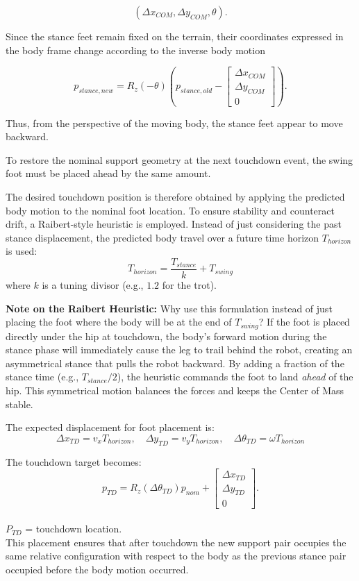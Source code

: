 \documentclass[11pt,a4paper]{report}
\begin{document}
\[
(\Delta x_{COM},\Delta y_{COM},\theta).
\]

Since the stance feet remain fixed on the terrain, their coordinates
expressed in the body frame change according to the inverse body motion

\[
p_{stance,new}
=
R_z(-\theta)
\left(
p_{stance,old}
-
\begin{bmatrix}
\Delta x_{COM}\\
\Delta y_{COM}\\
0
\end{bmatrix}
\right).
\]

Thus, from the perspective of the moving body, the stance feet appear
to move backward.

To restore the nominal support geometry at the next touchdown event,
the swing foot must be placed ahead by the same amount.

The desired touchdown position is therefore obtained by applying the predicted body motion to the nominal foot location. To ensure stability and counteract drift, a Raibert-style heuristic is employed. Instead of just considering the past stance displacement, the predicted body travel over a future time horizon $T_{horizon}$ is used:
\[
T_{horizon} = \frac{T_{stance}}{k} + T_{swing}
\]
where $k$ is a tuning divisor (e.g., $1.2$ for the trot). 

\textbf{Note on the Raibert Heuristic:} Why use this formulation instead of just placing the foot where the body will be at the end of $T_{swing}$? If the foot is placed directly under the hip at touchdown, the body's forward motion during the stance phase will immediately cause the leg to trail behind the robot, creating an asymmetrical stance that pulls the robot backward. By adding a fraction of the stance time (e.g., $T_{stance}/2$), the heuristic commands the foot to land \textit{ahead} of the hip. This symmetrical motion balances the forces and keeps the Center of Mass stable.

The expected displacement for foot placement is:
\[
\Delta x_{TD} = v_x T_{horizon}, \quad \Delta y_{TD} = v_y T_{horizon}, \quad \Delta \theta_{TD} = \omega T_{horizon}
\]

The touchdown target becomes:
\[
p_{TD}
=
R_z(\Delta \theta_{TD})p_{nom}
+
\begin{bmatrix}
\Delta x_{TD}\\
\Delta y_{TD}\\
0
\end{bmatrix}.
\]
\\
$P_{TD}$ = touchdown location.\\
This placement ensures that after touchdown the new support pair
occupies the same relative configuration with respect to the body as
the previous stance pair occupied before the body motion occurred.
\end{document}
